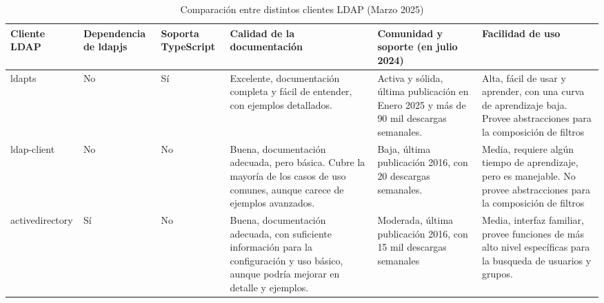 \begin{landscape}
    \begin{longtable}{|l|p{3cm}|p{2.5cm}|p{6cm}|p{5cm}|p{6cm}|}
        \caption{Comparación entre distintos clientes LDAP (Marzo 2025)}
        \label{table:ldap-client-comparison}                                                                                                                                                                                                                                                                                                                                                                                                                \\
        \hline
        \textbf{Cliente LDAP} & \textbf{Dependencia de ldapjs} & \textbf{Soporta TypeScript} & \textbf{Calidad de la documentación}                                                                                                       & \textbf{Comunidad y soporte (en julio 2024)}                                           & \textbf{Facilidad de uso}                                                                                              \\
        \hline
        \endfirsthead
        ldapts                & No                             & Sí                          & Excelente, documentación completa y fácil de entender, con ejemplos detallados.                                                            & Activa y sólida, última publicación en Enero 2025 y más de 90 mil descargas semanales. & Alta, fácil de usar y aprender, con una curva de aprendizaje baja. Provee abstracciones para la composición de filtros \\
        \hline
        ldap-client           & No                             & No                          & Buena, documentación adecuada, pero básica. Cubre la mayoría de los casos de uso comunes, aunque carece de ejemplos avanzados.             & Baja, última publicación 2016, con 20 descargas semanales.                             & Media, requiere algún tiempo de aprendizaje, pero es manejable. No provee abstracciones para la composición de filtros \\
        \hline
        activedirectory       & Sí                             & No                          & Buena, documentación adecuada, con suficiente información para la configuración y uso básico, aunque podría mejorar en detalle y ejemplos. & Moderada, última publicación 2016, con 15 mil descargas semanales                      & Media, interfaz familiar, provee funciones de más alto nivel  específicas  para la busqueda de usuarios y grupos.      \\

\end{longtable}
\end{landscape}

